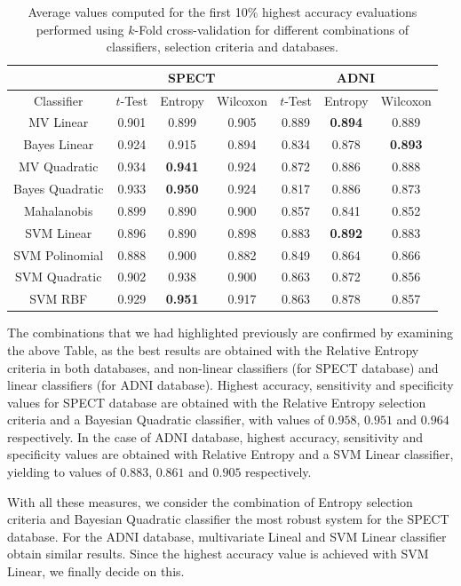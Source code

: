 	\begin{table}[ht]
		\centering
		\begin{tabular}{ccccccc}
			& \multicolumn{3}{c}{SPECT} & \multicolumn{3}{c}{ADNI} \\
			\hline \hline
			Classifier & $t$-Test & Entropy & Wilcoxon & $t$-Test & Entropy & Wilcoxon \\
			\hline 
			MV Linear & 0.901 & 0.899 & 0.905 & 0.889 & \textbf{0.894} & 0.889 \\
			Bayes Linear & 0.924 & 0.915 & 0.894 & 0.834 & 0.878 & \textbf{0.893} \\
			MV Quadratic & 0.934 & \textbf{0.941} & 0.924 & 0.872 & 0.886 & 0.888 \\
			Bayes Quadratic & 0.933 & \textbf{0.950} & 0.924 & 0.817 & 0.886 & 0.873 \\
			Mahalanobis & 0.899 & 0.890 & 0.900 & 0.857 & 0.841 & 0.852 \\
			SVM Linear & 0.896 & 0.890 & 0.898 & 0.883 & \textbf{0.892} & 0.883 \\
			SVM Polinomial & 0.888 & 0.900 & 0.882 & 0.849 & 0.864 & 0.866 \\
			SVM Quadratic & 0.902 & 0.938 & 0.900 & 0.863 & 0.872 & 0.856 \\
			SVM RBF & 0.929 & \textbf{0.951} & 0.917 & 0.863 & 0.878 & 0.857 \\
			\hline
			\hline
		\end{tabular}
		\caption{Average values computed for the first 10\% highest accuracy evaluations performed using $k$-Fold cross-validation for different combinations of classifiers, selection criteria and databases. }
		\label{tab:icaMaxAccK}
	\end{table}
	
	The combinations that we had highlighted previously are confirmed by examining the above Table, as the best results are obtained with the Relative Entropy criteria in both databases, and non-linear classifiers (for SPECT database) and linear classifiers (for ADNI database). Highest accuracy, sensitivity and specificity values for SPECT database are obtained with the Relative Entropy selection criteria and a Bayesian Quadratic classifier, with values of $0.958$, $0.951$ and $0.964$ respectively. In the case of ADNI database, highest accuracy, sensitivity and specificity values are obtained with Relative Entropy and a SVM Linear classifier, yielding to values of $0.883$, $0.861$ and $0.905$ respectively. 
	
	
	With all these measures, we consider the combination of Entropy selection criteria and Bayesian Quadratic classifier the most robust system for the SPECT database. For the ADNI database, multivariate Lineal and SVM Linear classifier obtain similar results. Since the highest accuracy value is achieved with SVM Linear, we finally decide on this. 
	
